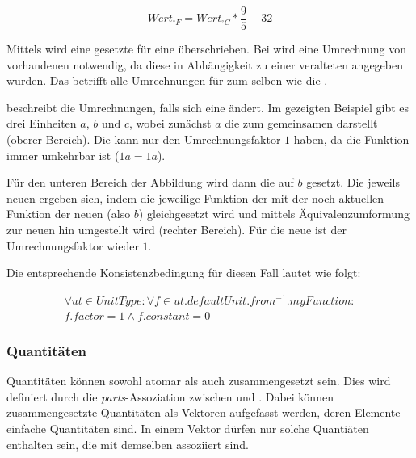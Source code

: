 \[Wert_{^\circ F} = Wert_{^\circ C} * \frac{9}{5} + 32\]

Mittels  wird eine gesetzte  für eine  überschrieben.
Bei  wird eine Umrechnung von vorhandenen  notwendig, da diese in Abhängigkeit zu einer veralteten  angegeben wurden. 
Das betrifft alle Umrechnungen für  zum selben  wie die .

 beschreibt die Umrechnungen, falls sich eine  ändert.
Im gezeigten Beispiel gibt es drei Einheiten $a$, $b$ und $c$, wobei zunächst $a$ die  zum gemeinsamen  darstellt (oberer Bereich). Die  kann nur den Umrechnungsfaktor $1$ haben, da die Funktion immer umkehrbar ist ($1a=1a$). 

Für den unteren Bereich der Abbildung wird dann die  auf $b$ gesetzt. Die jeweils neuen  ergeben sich, indem die jeweilige Funktion der  mit der noch aktuellen Funktion der neuen  (also $b$) gleichgesetzt wird und mittels Äquivalenzumformung zur neuen  hin umgestellt wird (rechter Bereich). Für die neue  ist der Umrechnungsfaktor wieder $1$.

Die entsprechende Konsistenzbedingung für diesen Fall lautet wie folgt:

\begin{equation} 
\begin{split}
\forall ut \in UnitType : \forall f \in ut.defaultUnit.from^{-1}.myFunction: \\
f.factor = 1 \wedge f.constant = 0 
\end{split}
\end{equation} 

\subsubsection{Quantitäten}\label{Quantitaeten}


Quantitäten können sowohl atomar als auch zusammengesetzt sein.
Dies wird definiert durch die \textit{parts}-Assoziation zwischen  und . 
Dabei können zusammengesetzte Quantitäten als Vektoren aufgefasst werden, deren Elemente einfache Quantitäten sind. 
In einem Vektor dürfen nur solche Quantiäten enthalten sein, die mit demselben  assoziiert sind. 

